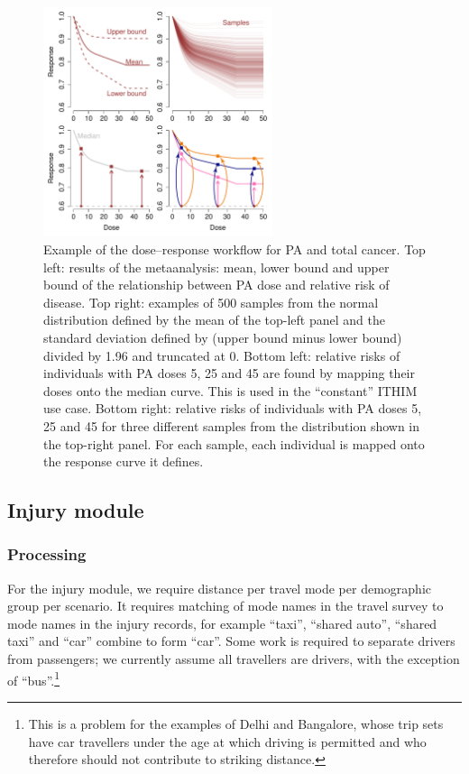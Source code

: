 \documentclass{article}
\begin{document}
\begin{figure}[H]
\centering
\includegraphics[width=0.6\textwidth]{cancer_PA_dose_response.pdf}
\caption{\small Example of the dose--response workflow for PA and total cancer. Top left: results of the metaanalysis: mean, lower bound and upper bound of the relationship between PA dose and relative risk of disease. Top right: examples of 500 samples from the normal distribution defined by the mean of the top-left panel and the standard deviation defined by (upper bound minus lower bound) divided by 1.96 and truncated at 0. Bottom left: relative risks of individuals with PA doses 5, 25 and 45 are found by mapping their doses onto the median curve. This is used in the ``constant'' ITHIM use case. Bottom right: relative risks of individuals with PA doses 5, 25 and 45 for three different samples from the distribution shown in the top-right panel. For each sample, each individual is mapped onto the response curve it defines. }
\label{cancer}
\end{figure}
  
\subsection{Injury module}

\subsubsection{Processing}

For the injury module, we require distance per travel mode per demographic group per scenario. It requires matching of mode names in the travel survey to mode names in the injury records, for example ``taxi'', ``shared auto'', ``shared taxi'' and ``car'' combine to form ``car''. Some work is required to separate drivers from passengers; we currently assume all travellers are drivers, with the exception of ``bus''.\footnote{This is a problem for the examples of Delhi and Bangalore, whose trip sets have car travellers under the age at which driving is permitted and who therefore should not contribute to striking distance.}
\end{document}
